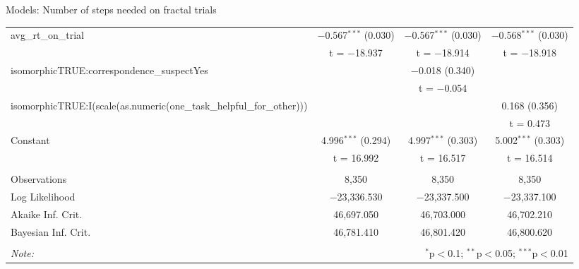 \documentclass{beamer}
\begin{document}
\begin{frame}{Models: Number of steps needed on fractal trials}
\begin{center}
{\begin{tabular}{@{\extracolsep{5pt}}lccc}
  avg\_rt\_on\_trial & $-$0.567$^{***}$ (0.030) & $-$0.567$^{***}$ (0.030) & $-$0.568$^{***}$ (0.030) \\ 
  & t = $-$18.937 & t = $-$18.914 & t = $-$18.918 \\ 
  isomorphicTRUE:correspondence\_suspectYes &  & $-$0.018 (0.340) &  \\ 
  &  & t = $-$0.054 &  \\ 
  isomorphicTRUE:I(scale(as.numeric(one\_task\_helpful\_for\_other))) &  &  & 0.168 (0.356) \\ 
  &  &  & t = 0.473 \\ 
  Constant & 4.996$^{***}$ (0.294) & 4.997$^{***}$ (0.303) & 5.002$^{***}$ (0.303) \\ 
  & t = 16.992 & t = 16.517 & t = 16.514 \\ 
 \hline \\[-1.8ex] 
Observations & 8,350 & 8,350 & 8,350 \\ 
Log Likelihood & $-$23,336.530 & $-$23,337.500 & $-$23,337.100 \\ 
Akaike Inf. Crit. & 46,697.050 & 46,703.000 & 46,702.210 \\ 
Bayesian Inf. Crit. & 46,781.410 & 46,801.420 & 46,800.620 \\ 
\hline 
\hline \\[-1.8ex] 
\textit{Note:}  & \multicolumn{3}{r}{$^{*}$p$<$0.1; $^{**}$p$<$0.05; $^{***}$p$<$0.01} \\ 
\end{tabular} 
} 
\end{center}

\end{frame}
\end{document}
